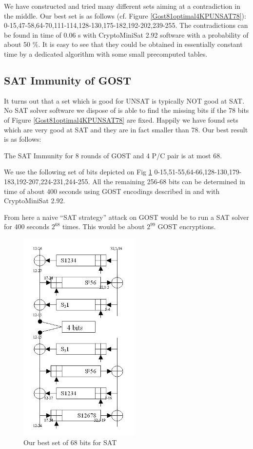 We have constructed and tried many different sets aiming at a contradiction in the middle.
Our best set is as follows (cf. Figure \ref{Gost81optimal4KPUNSAT78}):
0-15,47-58,64-70,111-114,128-130,175-182,192-202,239-255.
The contradictions can be found in time of 0.06 s
with CryptoMiniSat 2.92 software \cite{CryptoMiniSat}
with a probability of about 50 $\%$.
It is easy to see that they could be obtained in essentially constant time
by a dedicated algorithm with some small precomputed tables.

\subsection{SAT Immunity of GOST}
It turns out that a set which is good for UNSAT is typically NOT good at SAT.
No SAT solver software we dispose of is able to find the missing bits if the 78 bits of Figure \ref{Gost81optimal4KPUNSAT78} are fixed.
Happily we have found sets which are very good at SAT and they are in fact smaller than 78.
Our best result is as follows:

\begin{lemma}
The SAT Immunity for 8 rounds of GOST and 4 P/C pair is at most 68.
\end{lemma}
	
We use the following set of bits
depicted on Fig \ref{Gost81optimal4KPSAT68Bits}
0-15,51-55,64-66,128-130,179-183,192-207,224-231,244-255.
All the remaining 256-68 bits can be determined in time of
about 400 seconds
using GOST encodings described in \cite{OptimiPaper}
and with CryptoMiniSat 2.92.

From here a naive ``SAT strategy'' attack on GOST would be to run
a SAT solver for 400 seconds $2^{68}$ times.
This would be about $2^{99}$ GOST encryptions.


\begin{figure}[h!]
	\centering
	\includegraphics[width=60mm]{./pics/gost81optimalSAT4KP.jpg}
	\caption{Our best set of 68 bits for SAT}
	\label{Gost81optimal4KPSAT68Bits}
\end{figure}

